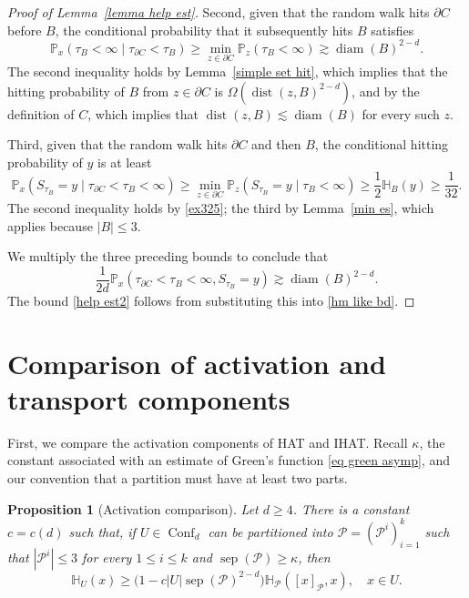 \documentclass[11pt,reqno]{amsart}
\newtheorem{proposition}[lemma]{Proposition}
\theoremstyle{definition}
\numberwithin{equation}{section}
\renewcommand{\P}{\mathbb{P}}
\newcommand{\1}{\mathbf{1}}
\renewcommand{\H}{\mathbb{H}}
\newcommand{\bdy}{\partial}
\DeclareMathOperator{\dist}{dist}
\DeclareMathOperator{\diam}{diam}
\DeclareMathOperator{\sep}{sep}
\DeclareMathOperator{\Conf}{\mathrm{Conf}}
\begin{document}
\begin{proof}[Proof of Lemma~\ref{lemma help est}]
Second, given that the random walk hits $\bdy C$ before $B$, the conditional probability that it subsequently hits $B$ satisfies
\[
\P_x (\tau_B < \infty \mid \tau_{\bdy C} < \tau_B) \geq \min_{z \in \bdy C} \P_z (\tau_B < \infty) \gtrsim \diam (B)^{2-d}.
\]
The second inequality holds by Lemma~\ref{simple set hit}, which implies that the hitting probability of $B$ from $z \in \bdy C$ is $\Omega (\dist(z, B)^{2-d})$, and by the definition of $C$, which implies that $\dist (z, B) \lesssim \diam (B)$ for every such $z$.

Third, given that the random walk hits $\bdy C$ and then $B$, the conditional hitting probability of $y$ is at least 
\[
\P_x (S_{\tau_B} = y \mid \tau_{\bdy C} < \tau_B < \infty) \geq \min_{z \in \bdy C} \P_z (S_{\tau_B} = y \mid \tau_B < \infty) \geq \frac12 \H_B (y) \geq \frac{1}{32}.
\]
The second inequality holds by \eqref{ex325}; the third by Lemma~\ref{min es}, which applies because $|B| \leq 3$.

We multiply the three preceding bounds to conclude that
\[
\frac{1}{2d} \P_x (\tau_{\bdy C} < \tau_B < \infty, S_{\tau_B} = y) \gtrsim \diam (B)^{2-d}.
\]
The bound \eqref{help est2} follows from substituting this into \eqref{hm like bd}. 
\end{proof}



\section{Comparison of activation and transport components}\label{comp act}

First, we compare the activation components of HAT and IHAT. Recall $\kappa$, the constant associated with an estimate of Green's function \eqref{eq green asymp}, and our convention that a partition must have at least two parts.

\begin{proposition}[Activation comparison]\label{prop h comp}
Let $d \geq 4$. There is a constant $c = c (d)$ such that, if $U \in \Conf_d$ can be partitioned into $\mathcal{P} = (\mathcal{P}^i)_{i=1}^k$ such that $|\mathcal{P}^i| \leq 3$ for every $1 \leq i \leq k$ and $\sep (\mathcal{P}) \geq \kappa$, then 
\begin{equation}\label{hm for laycon}
\H_U (x) \geq \big(1 - c |U| \sep(\mathcal{P}) ^{2-d} \big) \H_{\mathcal{P}} ([x]_{\mathcal{P}},x), \quad x \in U.
\end{equation}
\end{proposition}
\end{document}
